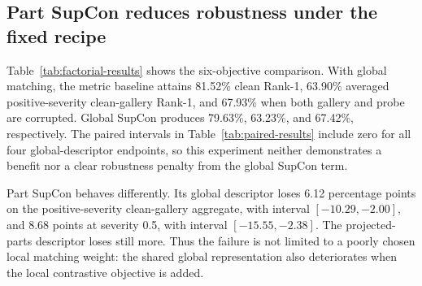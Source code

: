 \documentclass[pdflatex,iicol,sn-apa]{sn-jnl}
\begin{document}
\subsection{Part SupCon reduces robustness under the fixed recipe}

Table~\ref{tab:factorial-results} shows the six-objective comparison. With global
matching, the metric baseline attains 81.52\% clean Rank-1, 63.90\% averaged
positive-severity clean-gallery Rank-1, and 67.93\% when both gallery and probe
are corrupted. Global SupCon produces 79.63\%, 63.23\%, and 67.42\%,
respectively. The paired intervals in Table~\ref{tab:paired-results} include
zero for all four global-descriptor endpoints, so this experiment neither
demonstrates a benefit nor a clear robustness penalty from the global SupCon
term.

Part SupCon behaves differently. Its global descriptor loses 6.12 percentage
points on the positive-severity clean-gallery aggregate, with interval
$[-10.29,-2.00]$, and 8.68 points at severity 0.5, with interval
$[-15.55,-2.38]$. The projected-parts descriptor loses still more. Thus the
failure is not limited to a poorly chosen local matching weight: the shared
global representation also deteriorates when the local contrastive objective is
added.
\end{document}

